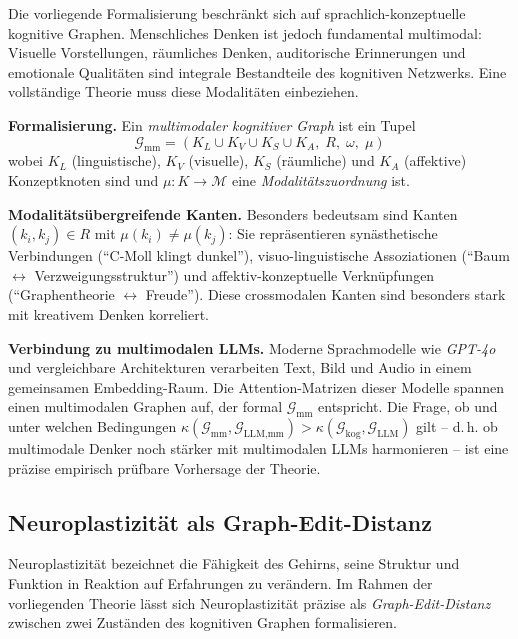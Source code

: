 ﻿\documentclass[12pt,a4paper]{article}
\theoremstyle{plain}
\theoremstyle{definition}
\theoremstyle{remark}
\newcommand{\GG}{\mathcal{G}}
\begin{document}
Die vorliegende Formalisierung beschränkt sich auf sprachlich-konzeptuelle kognitive Graphen. Menschliches Denken ist jedoch fundamental multimodal: Visuelle Vorstellungen, räumliches Denken, auditorische Erinnerungen und emotionale Qualitäten sind integrale Bestandteile des kognitiven Netzwerks. Eine vollständige Theorie muss diese Modalitäten einbeziehen.

\textbf{Formalisierung.} Ein \emph{multimodaler kognitiver Graph} ist ein Tupel
\[
  \GG_{\text{mm}} = (K_L \cup K_V \cup K_S \cup K_A,\; R,\; \omega,\; \mu)
\]
wobei $K_L$ (linguistische), $K_V$ (visuelle), $K_S$ (räumliche) und $K_A$ (affektive) Konzeptknoten sind und $\mu: K \to \mathcal{M}$ eine \emph{Modalitätszuordnung} ist.

\textbf{Modalitätsübergreifende Kanten.} Besonders bedeutsam sind Kanten $(k_i, k_j) \in R$ mit $\mu(k_i) \neq \mu(k_j)$: Sie repräsentieren synästhetische Verbindungen (``C-Moll klingt dunkel''), visuo-linguistische Assoziationen (``Baum $\leftrightarrow$ Verzweigungsstruktur'') und affektiv-konzeptuelle Verknüpfungen (``Graphentheorie $\leftrightarrow$ Freude''). Diese crossmodalen Kanten sind besonders stark mit kreativem Denken korreliert.

\textbf{Verbindung zu multimodalen LLMs.} Moderne Sprachmodelle wie \textit{GPT-4o} und vergleichbare Architekturen verarbeiten Text, Bild und Audio in einem gemeinsamen Embedding-Raum. Die Attention-Matrizen dieser Modelle spannen einen multimodalen Graphen auf, der formal $\GG_{\text{mm}}$ entspricht. Die Frage, ob und unter welchen Bedingungen $\kappa(\GG_{\text{mm}}, \GG_{\text{LLM,mm}}) > \kappa(\GG_{\text{kog}}, \GG_{\text{LLM}})$ gilt -- d.\,h. ob multimodale Denker noch stärker mit multimodalen LLMs harmonieren -- ist eine präzise empirisch prüfbare Vorhersage der Theorie.

\subsection{Neuroplastizität als Graph-Edit-Distanz}
\label{subsec:plastizitaet}

Neuroplastizität bezeichnet die Fähigkeit des Gehirns, seine Struktur und Funktion in Reaktion auf Erfahrungen zu verändern. Im Rahmen der vorliegenden Theorie lässt sich Neuroplastizität präzise als \emph{Graph-Edit-Distanz} zwischen zwei Zuständen des kognitiven Graphen formalisieren.
\end{document}
